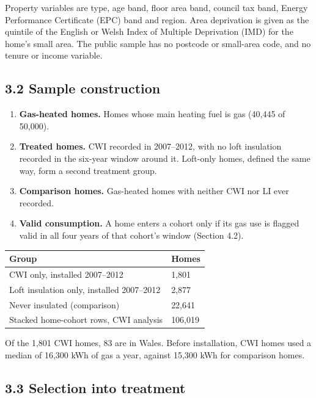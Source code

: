 \documentclass[11pt,a4paper]{article}
\providecommand{\tightlist}{\setlength{\itemsep}{0pt}\setlength{\parskip}{0pt}}
\begin{document}
Property variables are type, age band, floor area band, council tax band, Energy Performance Certificate (EPC) band and region. Area deprivation is given as the quintile of the English or Welsh Index of Multiple Deprivation (IMD) for the home's small area. The public sample has no postcode or small-area code, and no tenure or income variable.

\subsection*{3.2 Sample construction}

\begin{enumerate}
\def\labelenumi{\arabic{enumi}.}
\tightlist
\item
  \textbf{Gas-heated homes.} Homes whose main heating fuel is gas (40,445 of 50,000).
\item
  \textbf{Treated homes.} CWI recorded in 2007--2012, with no loft insulation recorded in the six-year window around it. Loft-only homes, defined the same way, form a second treatment group.
\item
  \textbf{Comparison homes.} Gas-heated homes with neither CWI nor LI ever recorded.
\item
  \textbf{Valid consumption.} A home enters a cohort only if its gas use is flagged valid in all four years of that cohort's window (Section 4.2).
\end{enumerate}

{\small
\begin{longtable}[]{@{}ll@{}}
\toprule\noalign{}
Group & Homes \\
\midrule\noalign{}
\endhead
\bottomrule\noalign{}
\endlastfoot
CWI only, installed 2007--2012 & 1,801 \\
Loft insulation only, installed 2007--2012 & 2,877 \\
Never insulated (comparison) & 22,641 \\
Stacked home-cohort rows, CWI analysis & 106,019 \\
\end{longtable}
}

Of the 1,801 CWI homes, 83 are in Wales. Before installation, CWI homes used a median of 16,300 kWh of gas a year, against 15,300 kWh for comparison homes.

\subsection*{3.3 Selection into treatment}
\end{document}
